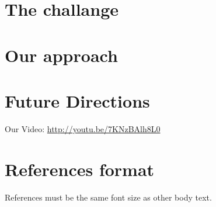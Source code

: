\documentclass{sigchi}
\begin{document}


\section{The challange}

\section{Our approach}

\section{Future Directions}
Our Video: \url{http://youtu.be/7KNzBAlh8L0}

\section{References format}
References must be the same font size as other body text.



\end{document}
